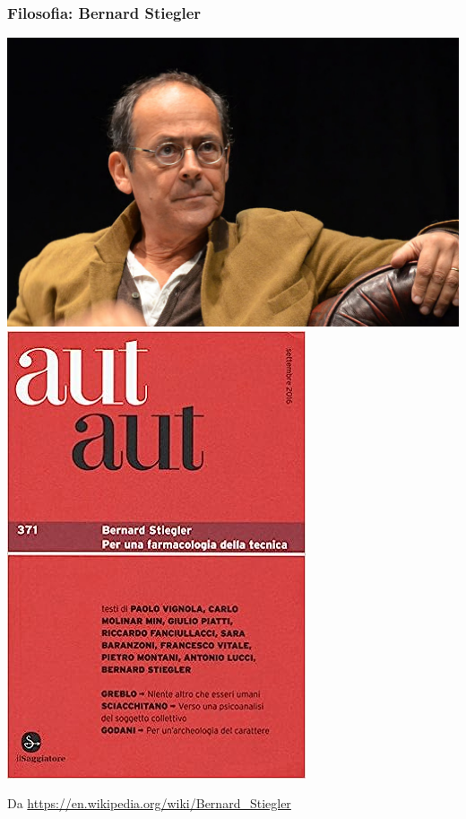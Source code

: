 \documentclass[xcolor=svgnames]{beamer}
\begin{document}
\begin{frame}

\end{frame}

\begin{frame}\small\frametitle{Filosofia: Bernard Stiegler}

  \includegraphics[height=.5\textheight]{pictures/stiegler.jpg} \hfill   \includegraphics[height=.5\textheight]{pictures/autaut.jpg}

  {\tiny Da \url{https://en.wikipedia.org/wiki/Bernard_Stiegler}}


\end{frame}
\end{document}

